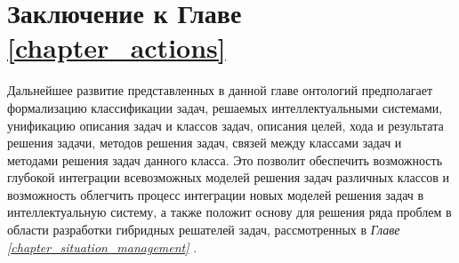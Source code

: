 \begin{comment}
Поскольку разработка каждой конкретной \textit{технологии} требует больших затрат, очень важно, чтобы \textit{технологии} создавались не под конкретные \textit{деятельности}, а для целых классов деятельностей (\textit{видов деятельности}). При этом важно, чтобы разрабатываемые \textit{технологии} охватывали как можно большее количество деятельностей, входящих в состав указанных \textit{видов деятельности}. Из этого следует целесообразность конвергенции и унификации различных сфер \textit{деятельности} для того, чтобы повысить мощность применения (использования) каждой разрабатываемой \textit{технологии}.

Кроме того важна \textit{совместимость технологий}, позволяющая решать \textit{задачи}, требующие одновременного использования нескольких \textit{технологий}, причем, в непредсказуемых сочетаниях. Очень важно также, кроме \textit{видов деятельности}, которым соответствуют конкретные \textit{технологии}, ввести \textit{обобщенные виды деятельности} и построить их иерархии, явно фиксировать стандарты, которым должны соответствовать все виды соответствующего обобщенного \textit{вида деятельности}. Это необходимо для обеспечения совместимости \textit{технологий}. Все используемые технологии должны \scnqq{пронизывать} друг друга и составлять стройную иерархическую систему совместимых технологий (сумму технологий).
\end{comment}

\section*{Заключение к Главе \ref{chapter_actions}}

Дальнейшее развитие представленных в данной главе онтологий предполагает формализацию классификации задач, решаемых интеллектуальными системами, унификацию описания задач и классов задач, описания целей, хода и результата решения задачи, методов решения задач, связей между классами задач и методами решения задач данного класса.
Это позволит обеспечить возможность глубокой интеграции всевозможных моделей решения задач различных классов и возможность облегчить процесс интеграции новых моделей решения задач в интеллектуальную систему, а также положит основу для решения ряда проблем в области разработки гибридных решателей задач, рассмотренных в \textit{Главе \ref{chapter_situation_management} }.

%